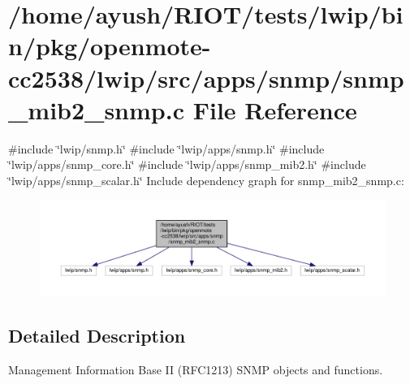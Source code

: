 \hypertarget{openmote-cc2538_2lwip_2src_2apps_2snmp_2snmp__mib2__snmp_8c}{}\section{/home/ayush/\+R\+I\+O\+T/tests/lwip/bin/pkg/openmote-\/cc2538/lwip/src/apps/snmp/snmp\+\_\+mib2\+\_\+snmp.c File Reference}
\label{openmote-cc2538_2lwip_2src_2apps_2snmp_2snmp__mib2__snmp_8c}
{\ttfamily \#include \char`\"{}lwip/snmp.\+h\char`\"{}}\newline
{\ttfamily \#include \char`\"{}lwip/apps/snmp.\+h\char`\"{}}\newline
{\ttfamily \#include \char`\"{}lwip/apps/snmp\+\_\+core.\+h\char`\"{}}\newline
{\ttfamily \#include \char`\"{}lwip/apps/snmp\+\_\+mib2.\+h\char`\"{}}\newline
{\ttfamily \#include \char`\"{}lwip/apps/snmp\+\_\+scalar.\+h\char`\"{}}\newline
Include dependency graph for snmp\+\_\+mib2\+\_\+snmp.\+c\+:
\nopagebreak
\begin{figure}[H]
\begin{center}
\leavevmode
\includegraphics[width=350pt]{openmote-cc2538_2lwip_2src_2apps_2snmp_2snmp__mib2__snmp_8c__incl}
\end{center}
\end{figure}


\subsection{Detailed Description}
Management Information Base II (R\+F\+C1213) S\+N\+MP objects and functions. 